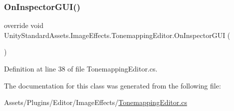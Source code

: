 \subsubsection{\texorpdfstring{On\+Inspector\+G\+U\+I()}{OnInspectorGUI()}}
{\footnotesize\ttfamily override void Unity\+Standard\+Assets.\+Image\+Effects.\+Tonemapping\+Editor.\+On\+Inspector\+G\+UI (\begin{DoxyParamCaption}{ }\end{DoxyParamCaption})}



Definition at line 38 of file Tonemapping\+Editor.\+cs.



The documentation for this class was generated from the following file\+:\begin{DoxyCompactItemize}
\item 
Assets/\+Plugins/\+Editor/\+Image\+Effects/\mbox{\hyperlink{_tonemapping_editor_8cs}{Tonemapping\+Editor.\+cs}}\end{DoxyCompactItemize}
